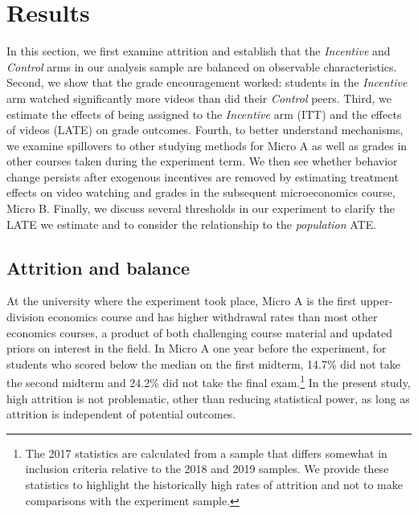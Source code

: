\documentclass[12pt]{article}
\begin{document}

\section{Results} \label{sec:results}

In this section, we first examine attrition and establish that the \textit{Incentive} and \textit{Control} arms in our analysis sample are balanced on observable characteristics.
Second, we show that the grade encouragement worked: students in the \textit{Incentive} arm watched significantly more videos than did their \textit{Control} peers.
Third, we estimate the effects of being assigned to the \textit{Incentive} arm (ITT) and the effects of videos (LATE) on grade outcomes.
Fourth, to better understand mechanisms, we examine spillovers to other studying methods for Micro A as well as grades in other courses taken during the experiment term.
We then see whether behavior change persists after exogenous incentives are removed by estimating treatment effects on video watching and grades in the subsequent microeconomics course, Micro B.  Finally, we discuss several thresholds in our experiment to clarify the LATE we estimate and to consider the relationship to the \textit{population} ATE.


\subsection{Attrition and balance} \label{subsec:attrition}

At the university where the experiment took place, Micro A is the first upper-division economics course and has higher withdrawal rates than most other economics courses, a product of both challenging course material and updated priors on interest in the field.
In Micro A one year before the experiment, for students who scored below the median on the first midterm, 14.7\% did not take the second midterm and 24.2\% did not take the final exam.\footnote{The 2017 statistics are calculated from a sample that differs somewhat in inclusion criteria relative to the 2018 and 2019 samples. We provide these statistics to highlight the historically high rates of attrition and not to make comparisons with the experiment sample.} In the present study, high attrition is not problematic, other than reducing statistical power, as long as attrition is independent of potential outcomes.
\end{document}
